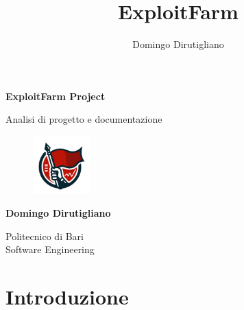\documentclass[11pt]{article}
\title{ExploitFarm}
\author{Domingo Dirutigliano}
\begin{document}
\begin{titlepage}
   \begin{center}
       \vspace*{1cm}

       \LARGE{\textbf{ExploitFarm Project}}

       \vspace{0.5cm}
        Analisi di progetto e documentazione
       
       \vspace{0.5cm}
       
       \begin{figure}[H]
    		\centering
    		\includegraphics[width=0.2\textwidth]{logo.png}
		\end{figure}
       
       \vspace{0.5cm}

       \textbf{Domingo Dirutigliano}

       \vfill
            
       Politecnico di Bari\\
       Software Engineering
            
       \vspace{0.1cm}
   \end{center}
\end{titlepage}

\tableofcontents
\newpage

\section{Introduzione}
\end{document}
